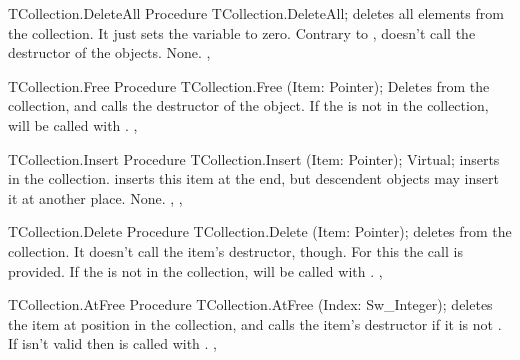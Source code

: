 \begin{procedure}{TCollection.DeleteAll}
\Declaration
Procedure TCollection.DeleteAll;
\Description
{} deletes all elements from the collection. It just sets 
the  variable to zero. Contrary to
,  doesn't call the
destructor of the objects.
\Errors
None.
\SeeAlso
{}, 
\end{procedure}


\begin{procedure}{TCollection.Free}
\Declaration
Procedure TCollection.Free (Item: Pointer);
\Description
{} Deletes  from the collection, and calls the destructor
 of the object.
\Errors
If the  is not in the collection,  will be called with
.
\SeeAlso
{},
\end{procedure}


\begin{procedure}{TCollection.Insert}
\Declaration
Procedure TCollection.Insert (Item: Pointer); Virtual;
\Description
{} inserts  in the collection. 
inserts this item at the end, but descendent objects may insert it at
another place.
\Errors
None.
\SeeAlso
{}, ,
\end{procedure}


\begin{procedure}{TCollection.Delete}
\Declaration
Procedure TCollection.Delete (Item: Pointer);
\Description
{} deletes  from the collection. It doesn't call the
item's destructor, though. For this the 
call is provided.
\Errors
If the  is not in the collection,  will be called with
.
\SeeAlso
{},
\end{procedure}


\begin{procedure}{TCollection.AtFree}
\Declaration
Procedure TCollection.AtFree (Index: Sw\_Integer);
\Description
{} deletes the item at position  in the collection,
and calls the item's destructor if it is not . 
\Errors
If  isn't valid then  is called
with .
\SeeAlso
{}, 
\end{procedure}


